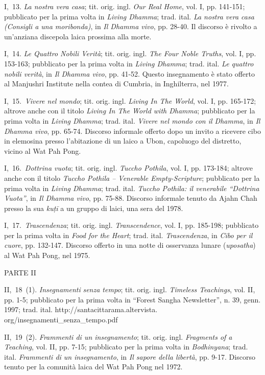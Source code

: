I,~13. \emph{La nostra vera casa}; tit. orig. ingl. \emph{Our Real
Home}, vol. I, pp. 141-151; pubblicato per la prima volta in
\emph{Living Dhamma}; trad. ital. \emph{La nostra vera casa (Consigli a
una moribonda)}, in \emph{Il Dhamma vivo}, pp. 28-40. Il discorso è
rivolto a un'anziana discepola laica prossima alla morte.

I,~14. \emph{Le Quattro Nobili Verità}; tit. orig. ingl. \emph{The Four
Noble Truths}, vol. I, pp. 153-163; pubblicato per la prima volta in
\emph{Living Dhamma}; trad. ital. \emph{Le quattro nobili verità}, in
\emph{Il Dhamma vivo}, pp. 41-52. Questo insegnamento è stato offerto al
Manjushri Institute nella contea di Cumbria, in Inghilterra, nel 1977.

I,~15.~\emph{Vivere nel mondo}; tit. orig. ingl. \emph{Living In The
World}, vol. I, pp. 165-172; altrove anche con il titolo \emph{Living In
The World with Dhamma}; pubblicato per la prima volta in \emph{Living
Dhamma}; trad. ital. \emph{Vivere nel mondo con il Dhamma}, in \emph{Il
Dhamma vivo}, pp. 65-74. Discorso informale offerto dopo un invito a
ricevere cibo in elemosina presso l'abitazione di un laico a Ubon,
capoluogo del distretto, vicino al Wat Pah Pong.

I,~16.~\emph{Dottrina vuota}; tit. orig. ingl. \emph{Tuccho Pothila},
vol. I, pp. 173-184; altrove anche con il titolo \emph{Tuccho Pothila --
Venerable Empty-Scripture}; pubblicato per la prima volta in
\emph{Living Dhamma}; trad. ital. \emph{Tuccho Pothila: il venerabile
``Dottrina Vuota''}, in \emph{Il Dhamma vivo}, pp. 75-88. Discorso
informale tenuto da Ajahn Chah presso la sua \emph{kuṭī} a un gruppo di
laici, una sera del 1978.

I,~17.~\emph{Trascendenza}; tit. orig. ingl. \emph{Transcendence}, vol.
I, pp. 185-198; pubblicato per la prima volta in \emph{Food for the
Heart}; trad. ital. \emph{Trascendenza}, in \emph{Cibo per il cuore},
pp. 132-147. Discorso offerto in una notte di osservanza lunare
(\emph{uposatha}) al Wat Pah Pong, nel 1975.

PARTE II

II,~18~(1). \emph{Insegnamenti} \emph{senza tempo}; tit. orig. ingl.
\emph{Timeless Teachings}, vol. II, pp. 1-5; pubblicato per la prima
volta in ``Forest Sangha Newsletter'', n. 39, genn. 1997; trad. ital.
http://santacittarama.altervista.\\
org/insegnamenti\_senza\_tempo.pdf

II,~19~(2). \emph{Frammenti di un insegnamento}; tit. orig. ingl.
\emph{Fragments of a Teaching}, vol. II, pp. 7-15; pubblicato per la
prima volta in \emph{Bodhinyana}; trad. ital. \emph{Frammenti di un
insegnamento}, in \emph{Il sapore della libertà}, pp. 9-17. Discorso
tenuto per la comunità laica del Wat Pah Pong nel 1972.

